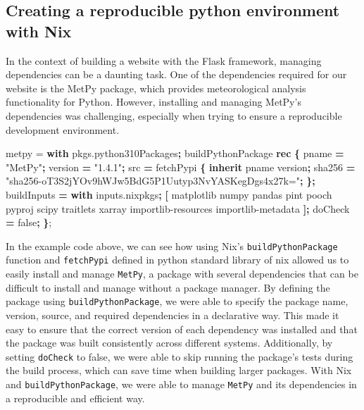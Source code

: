 \documentclass[
]{article}
\newenvironment{Shaded}{\begin{snugshade}}{\end{snugshade}}
\newcommand{\ConstantTok}[1]{\textcolor[rgb]{0.00,0.00,0.00}{#1}}
\newcommand{\KeywordTok}[1]{\textcolor[rgb]{0.13,0.29,0.53}{\textbf{#1}}}
\newcommand{\NormalTok}[1]{#1}
\newcommand{\OperatorTok}[1]{\textcolor[rgb]{0.81,0.36,0.00}{\textbf{#1}}}
\newcommand{\StringTok}[1]{\textcolor[rgb]{0.31,0.60,0.02}{#1}}
\newcommand{\VariableTok}[1]{\textcolor[rgb]{0.00,0.00,0.00}{#1}}
\begin{document}
\hypertarget{creating-a-reproducible-python-environment-with-nix}{%
\subsection{Creating a reproducible python environment with Nix}\label{creating-a-reproducible-python-environment-with-nix}}

In the context of building a website with the Flask framework, managing dependencies can be a daunting task. One of the dependencies required for our website is the MetPy package, which provides meteorological analysis functionality for Python. However, installing and managing MetPy's dependencies was challenging, especially when trying to ensure a reproducible development environment.

\begin{Shaded}
\begin{Highlighting}[]
\NormalTok{metpy = }\KeywordTok{with}\NormalTok{ pkgs.python310Packages}\OperatorTok{;}
\NormalTok{  buildPythonPackage }\KeywordTok{rec} \OperatorTok{\{}
    \VariableTok{pname} \OperatorTok{=} \StringTok{"MetPy"}\OperatorTok{;}
    \VariableTok{version} \OperatorTok{=} \StringTok{"1.4.1"}\OperatorTok{;}
    \VariableTok{src} \OperatorTok{=}\NormalTok{ fetchPypi }\OperatorTok{\{}
      \KeywordTok{inherit}\NormalTok{ pname version}\OperatorTok{;}
      \VariableTok{sha256} \OperatorTok{=} \StringTok{"sha256{-}oT3S2jYOv9hWJw5BdG5P1Uutyp3NvYASKegDgs4x27k="}\OperatorTok{;}
    \OperatorTok{\};}
    \VariableTok{buildInputs} \OperatorTok{=} \KeywordTok{with}\NormalTok{ inputs.nixpkgs}\OperatorTok{;} \OperatorTok{[}
\NormalTok{      matplotlib}
\NormalTok{      numpy}
\NormalTok{      pandas}
\NormalTok{      pint}
\NormalTok{      pooch}
\NormalTok{      pyproj}
\NormalTok{      scipy}
\NormalTok{      traitlets}
\NormalTok{      xarray}
\NormalTok{      importlib{-}resources}
\NormalTok{      importlib{-}metadata}
    \OperatorTok{];}
    \VariableTok{doCheck} \OperatorTok{=} \ConstantTok{false}\OperatorTok{;}
  \OperatorTok{\}}\NormalTok{;}
\end{Highlighting}
\end{Shaded}

In the example code above, we can see how using Nix's \texttt{buildPythonPackage} function and \texttt{fetchPypi} defined in python standard library of nix allowed us to easily install and manage \texttt{MetPy}, a package with several dependencies that can be difficult to install and manage without a package manager. By defining the package using \texttt{buildPythonPackage}, we were able to specify the package name, version, source, and required dependencies in a declarative way. This made it easy to ensure that the correct version of each dependency was installed and that the package was built consistently across different systems. Additionally, by setting \texttt{doCheck} to false, we were able to skip running the package's tests during the build process, which can save time when building larger packages. With Nix and \texttt{buildPythonPackage}, we were able to manage \texttt{MetPy} and its dependencies in a reproducible and efficient way.
\end{document}
